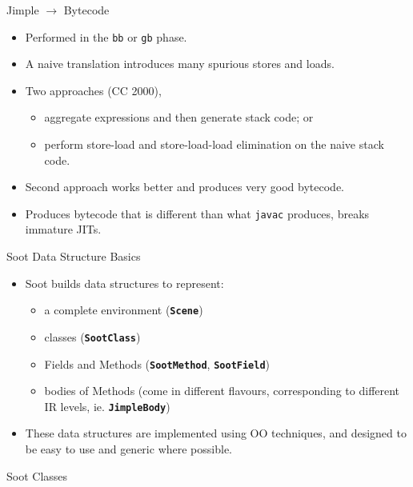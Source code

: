 \begin{slide} {Jimple $\rightarrow$ Bytecode}
\vspace{-0.3in}
\begin{itemize}
\item Performed in the \texttt{bb} or \texttt{gb} phase.
\item A naive translation introduces many spurious stores and loads.
\item Two approaches (CC 2000),  
\begin{itemize}
\item aggregate expressions and then generate stack
      code; or 
\item perform store-load and store-load-load elimination 
      on the naive stack code. 
\end{itemize}
\item Second approach works better and produces very good bytecode.
\item Produces bytecode that is different than what {\tt javac} 
produces,  breaks immature JITs.
\end{itemize}
\end{slide}

\begin{slide}{Soot Data Structure Basics}
\begin{itemize}
\item
Soot builds data structures to represent: 
\begin{itemize}
\item a complete environment (\textbf{\texttt{Scene}}) 
\item classes (\textbf{\texttt{SootClass}}) 
\item Fields and Methods (\textbf{\texttt{SootMethod}}, \textbf{\texttt{SootField}})
\item bodies of Methods (come in different flavours, corresponding to 
         different IR levels, ie. \textbf{\texttt{JimpleBody}})
\end{itemize}
\item
These data structures are implemented using OO techniques, and designed 
to be easy to use and generic where possible.  
\end{itemize}
\end{slide}

\begin{slide}{Soot Classes}
\vspace*{-0.1in}
\begin{center}

\end{center}
\end{slide}

